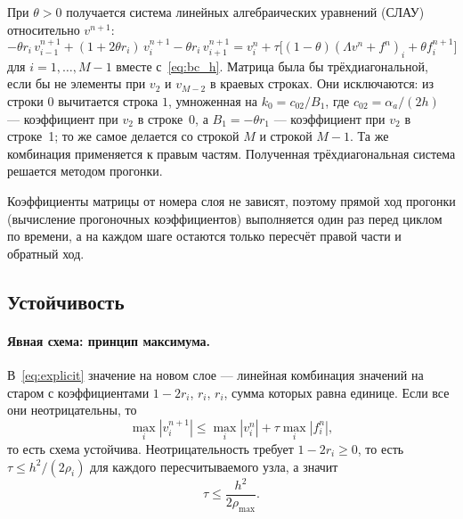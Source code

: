 \documentclass[12pt,a4paper]{article}
\begin{document}
При $\theta>0$ получается система линейных алгебраических уравнений
(СЛАУ) относительно $v^{n+1}$:
\begin{equation}\label{eq:slau}
-\theta r_i\,v_{i-1}^{n+1}+(1+2\theta r_i)\,v_i^{n+1}
-\theta r_i\,v_{i+1}^{n+1}
=v_i^n+\tau\bigl[(1-\theta)(\Lambda v^n+f^n)_i+\theta f_i^{n+1}\bigr]
\end{equation}
для $i=1,\dots,M-1$ вместе с~\eqref{eq:bc_h}. Матрица была бы
трёхдиагональной, если бы не элементы при $v_2$ и $v_{M-2}$ в краевых
строках. Они исключаются: из строки $0$ вычитается строка $1$,
умноженная на $k_0=c_{02}/B_1$, где $c_{02}=\alpha_a/(2h)$ ---
коэффициент при $v_2$ в строке~0, а $B_1=-\theta r_1$ --- коэффициент
при $v_2$ в строке~1; то же самое делается со строкой $M$ и строкой
$M-1$. Та же комбинация применяется к правым частям. Полученная
трёхдиагональная система решается методом прогонки.

Коэффициенты матрицы от номера слоя не зависят, поэтому прямой ход
прогонки (вычисление прогоночных коэффициентов) выполняется один раз
перед циклом по времени, а на каждом шаге остаются только пересчёт
правой части и обратный ход.

\subsection{Устойчивость}
\label{sec:stab}

\paragraph{Явная схема: принцип максимума.}
В~\eqref{eq:explicit} значение на новом слое --- линейная комбинация
значений на старом с коэффициентами $1-2r_i$, $r_i$, $r_i$, сумма
которых равна единице. Если все они неотрицательны, то
\[
\max_i|v_i^{n+1}|\le\max_i|v_i^n|+\tau\max_i|f_i^n|,
\]
то есть схема устойчива. Неотрицательность требует $1-2r_i\ge0$, то есть
$\tau\le h^2/(2\rho_i)$ для каждого пересчитываемого узла, а значит
\begin{equation}\label{eq:stabcond}
\tau\le\frac{h^2}{2\rho_{\max}} .
\end{equation}
\end{document}
